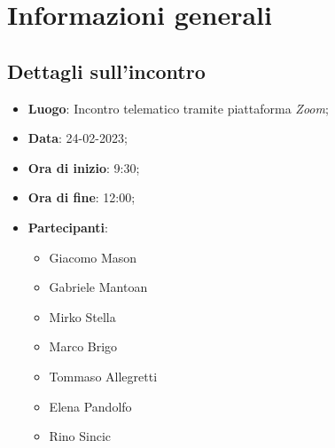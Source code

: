 \section{Informazioni generali}

\subsection{Dettagli sull'incontro}
\begin{itemize}
\item \textbf{Luogo}: Incontro telematico tramite piattaforma \textit{Zoom};
\item \textbf{Data}: 24-02-2023;
\item \textbf{Ora di inizio}: 9:30;
\item \textbf{Ora di fine}: 12:00;
\item \textbf{Partecipanti}: 
\begin{itemize}
	\item Giacomo Mason
	\item Gabriele Mantoan
	\item Mirko Stella
	\item Marco Brigo
	\item Tommaso Allegretti
	\item Elena Pandolfo
	\item Rino Sincic
\end{itemize}
\end{itemize}